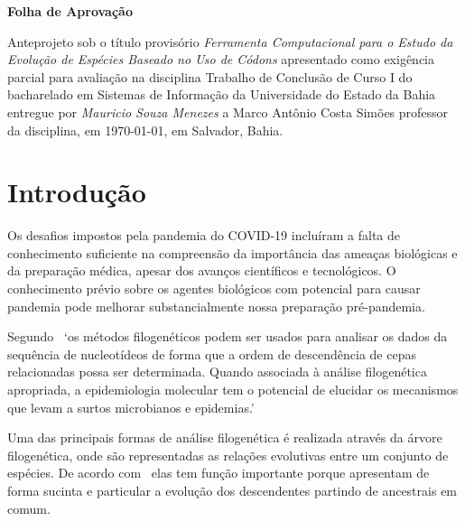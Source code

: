 \documentclass[font=plain]{abnt}
\begin{document}
\capa
\folhaderosto

\begin{folhadeaprovacao}
    \begin{center}
        \large
        \textbf{Folha de Aprovação}
    \end{center}

    Anteprojeto sob o título provisório \textit{Ferramenta Computacional para o Estudo da Evolução de Espécies Baseado no Uso de Códons} apresentado como exigência parcial para avaliação na disciplina Trabalho de Conclusão de Curso I do bacharelado em Sistemas de Informação da Universidade do Estado da Bahia entregue por \textit{Mauricio Souza Menezes} a Marco Antônio Costa Simões professor da disciplina, em \today, em Salvador, Bahia.
    \setlength{\ABNTsignthickness}{0.4pt}
    \setlength{\ABNTsignskip}{2cm}
    \hspace*{1cm}
    \hspace*{1cm}
\end{folhadeaprovacao}




\sumario


\chapter{Introdução}

Os desafios impostos pela pandemia do COVID-19 incluíram a falta de conhecimento suficiente na compreensão da importância das ameaças biológicas e da preparação médica, apesar dos avanços científicos e tecnológicos. O conhecimento prévio sobre os agentes biológicos com potencial para causar pandemia pode melhorar substancialmente nossa preparação pré-pandemia.~\cite[p. 1]{behl_threat_2022}

Segundo~\cite[p.1]{barry_phylogenetic_analysis_2006} `os métodos filogenéticos podem ser usados para analisar os dados da sequência de nucleotídeos de forma que a ordem de descendência de cepas relacionadas possa ser determinada. Quando associada à análise filogenética apropriada, a epidemiologia molecular tem o potencial de elucidar os mecanismos que levam a surtos microbianos e epidemias.'

Uma das principais formas de análise filogenética é realizada através da árvore filogenética, onde são representadas as relações evolutivas entre um conjunto de espécies. De acordo com~\cite{morrison_tree_thinking} elas tem função importante porque apresentam de forma sucinta e particular a evolução dos descendentes partindo de ancestrais em comum.
\end{document}
